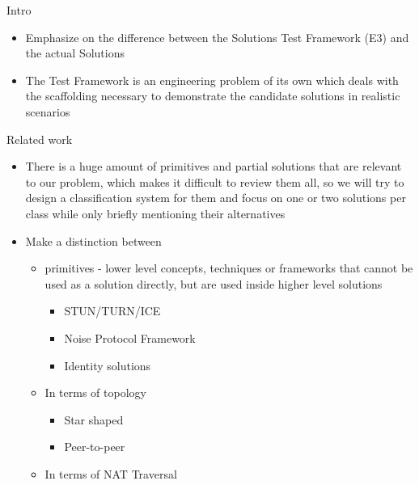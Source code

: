 \begin{frame}
\makeatletter
\def\fps@figure{h}
\makeatother
\end{frame}

\begin{frame}{Intro}
\protect\hypertarget{intro}{}
\begin{itemize}
\item
  Emphasize on the difference between the Solutions Test Framework (E3)
  and the actual Solutions
\item
  The Test Framework is an engineering problem of its own which deals
  with the scaffolding necessary to demonstrate the candidate solutions
  in realistic scenarios
\end{itemize}
\end{frame}

\begin{frame}{Related work}
\protect\hypertarget{related-work}{}
\begin{itemize}
\item
  There is a huge amount of primitives and partial solutions that are
  relevant to our problem, which makes it difficult to review them all,
  so we will try to design a classification system for them and focus on
  one or two solutions per class while only briefly mentioning their
  alternatives
\item
  Make a distinction between

  \begin{itemize}
  \tightlist
  \item
    primitives - lower level concepts, techniques or frameworks that
    cannot be used as a solution directly, but are used inside higher
    level solutions

    \begin{itemize}
    \tightlist
    \item
      STUN/TURN/ICE
    \item
      Noise Protocol Framework
    \item
      Identity solutions
    \end{itemize}
  \item
    In terms of topology

    \begin{itemize}
    \tightlist
    \item
      Star shaped
    \item
      Peer-to-peer
    \end{itemize}
  \item
    In terms of NAT Traversal


\end{itemize}
\end{itemize}
\end{frame}

